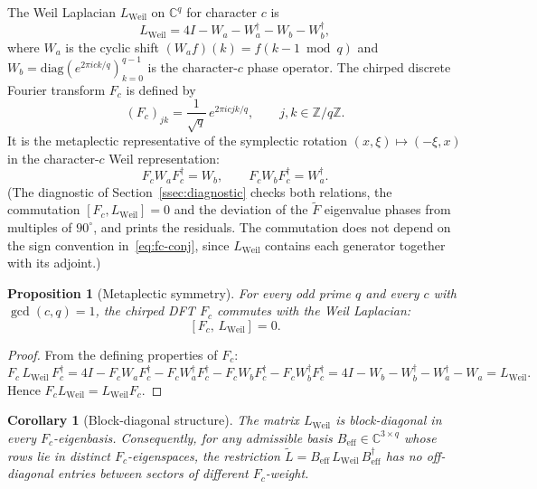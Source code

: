 \documentclass[11pt,a4paper]{article}
\newtheorem{proposition}[theorem]{Proposition}
\newtheorem{corollary}[theorem]{Corollary}
\begin{document}
    The Weil Laplacian $L_{\mathrm{Weil}}$ on $\mathbb{C}^q$ for character $c$ is
    \begin{equation}
      L_{\mathrm{Weil}} = 4I - W_a - W_a^\dagger - W_b - W_b^\dagger,
    \end{equation}
    where $W_a$ is the cyclic shift $(W_a f)(k) = f(k-1 \bmod q)$ and
    $W_b = \mathrm{diag}(e^{2\pi i c k/q})_{k=0}^{q-1}$ is the character-$c$ phase operator.
    The chirped discrete Fourier transform $F_c$ is defined by
    \begin{equation}
      (F_c)_{jk} = \frac{1}{\sqrt{q}}\, e^{2\pi i c jk/q}, \qquad j,k \in \mathbb{Z}/q\mathbb{Z}.
    \end{equation}
    It is the metaplectic representative of the symplectic rotation $(x,\xi) \mapsto (-\xi, x)$
    in the character-$c$ Weil representation:
    \begin{equation}
      \label{eq:fc-conj}
      F_c W_a F_c^\dagger = W_b, \qquad F_c W_b F_c^\dagger = W_a^\dagger .
    \end{equation}
    (The diagnostic of Section~\ref{ssec:diagnostic} checks both relations, the commutation
    $[F_c, L_{\mathrm{Weil}}] = 0$ and the deviation of the $\tilde F$ eigenvalue phases from
    multiples of $90^\circ$, and prints the residuals. The commutation does not depend on the sign
    convention in~\eqref{eq:fc-conj}, since $L_{\mathrm{Weil}}$ contains each generator together
    with its adjoint.)

    \begin{proposition}[Metaplectic symmetry]
      \label{prop:commute}
      For every odd prime $q$ and every $c$ with $\gcd(c,q) = 1$, the chirped DFT $F_c$ commutes with
      the Weil Laplacian:
      \[
        [F_c,\, L_{\mathrm{Weil}}] = 0.
      \]
    \end{proposition}

    \begin{proof}
      From the defining properties of $F_c$:
      \[
        F_c\, L_{\mathrm{Weil}}\, F_c^\dagger
        = 4I - F_c W_a F_c^\dagger - F_c W_a^\dagger F_c^\dagger
        - F_c W_b F_c^\dagger - F_c W_b^\dagger F_c^\dagger
        = 4I - W_b - W_b^\dagger - W_a^\dagger - W_a = L_{\mathrm{Weil}}.
      \]
      Hence $F_c L_{\mathrm{Weil}} = L_{\mathrm{Weil}} F_c$.
    \end{proof}

    \begin{corollary}[Block-diagonal structure]
      \label{cor:blockdiag}
      The matrix $L_{\mathrm{Weil}}$ is block-diagonal in every $F_c$-eigenbasis.
      Consequently, for any admissible basis $B_{\mathrm{eff}} \in \mathbb{C}^{3 \times q}$ whose rows
      lie in distinct $F_c$-eigenspaces, the restriction
      $\tilde{L} = B_{\mathrm{eff}}\, L_{\mathrm{Weil}}\, B_{\mathrm{eff}}^\dagger$ has no off-diagonal
      entries between sectors of different $F_c$-weight.
    \end{corollary}
\end{document}
